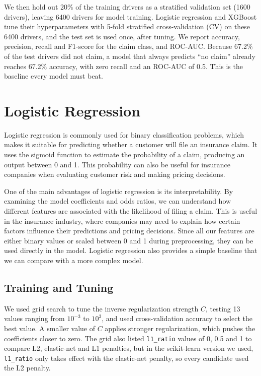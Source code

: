 \documentclass[conference]{IEEEtran}
\begin{document}
We then hold out 20\% of the training drivers as a stratified validation set (\num{1600} drivers), leaving
\num{6400} drivers for model training. Logistic regression and XGBoost tune their hyperparameters with
5-fold stratified cross-validation (CV) on these \num{6400} drivers, and the test set is used once, after
tuning. We report accuracy, precision, recall and F1-score for the claim class, and ROC-AUC. Because 67.2\%
of the test drivers did not claim, a model that always predicts ``no claim'' already reaches 67.2\%
accuracy, with zero recall and an ROC-AUC of 0.5. This is the baseline every model must beat.

\section{Logistic Regression}
Logistic regression is commonly used for binary classification problems, which makes it suitable for
predicting whether a customer will file an insurance claim. It uses the sigmoid function to estimate the
probability of a claim, producing an output between 0 and 1. This probability can also be useful for
insurance companies when evaluating customer risk and making pricing decisions.

One of the main advantages of logistic regression is its interpretability. By examining the model coefficients
and odds ratios, we can understand how different features are associated with the likelihood of filing a claim.
This is useful in the insurance industry, where companies may need to explain how certain factors influence
their predictions and pricing decisions. Since all our features are either binary values or scaled between
0 and 1 during preprocessing, they can be used directly in the model. Logistic regression also provides a simple
baseline that we can compare with a more complex model.

\subsection{Training and Tuning}
We used grid search to tune the inverse regularization strength $C$, testing 13 values ranging from
$10^{-3}$ to $10^{3}$, and used cross-validation accuracy to select the best value. A smaller value of $C$
applies stronger regularization, which pushes the coefficients closer to zero. The grid also listed
\texttt{l1\_ratio} values of 0, 0.5 and 1 to compare L2, elastic-net and L1 penalties, but in the
scikit-learn version we used, \texttt{l1\_ratio} only takes effect with the elastic-net penalty, so every
candidate used the L2 penalty.
\end{document}
